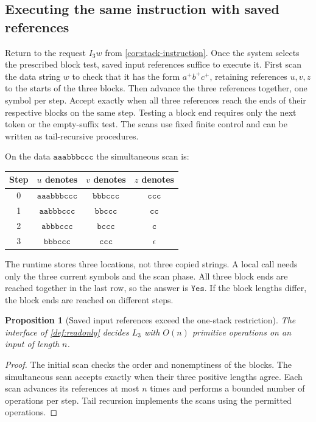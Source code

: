 \documentclass[11pt,twoside]{article}
\newtheorem{proposition}[theorem]{Proposition}
\theoremstyle{definition}
\theoremstyle{remark}
\begin{document}
\subsection{Executing the same instruction with saved references}

Return to the request $I_3w$ from \cref{cor:stack-instruction}. Once the
system selects the prescribed block test, saved input references suffice
to execute it. First scan the data string $w$ to
check that it has the form $a^+b^+c^+$, retaining references $u,v,z$ to the
starts of the three blocks. Then advance the three references together,
one symbol per step. Accept exactly when all three references reach the
ends of their respective blocks on the same step. Testing a block end
requires only the next token or the empty-suffix test. The scans use fixed
finite control and can be written as tail-recursive procedures.

On the data $\mathtt{aaabbbccc}$ the simultaneous scan is:
\begin{center}
\begin{tabular}{c c c c}
\toprule
Step & $u$ denotes & $v$ denotes & $z$ denotes \\
\midrule
0 & $\mathtt{aaabbbccc}$ & $\mathtt{bbbccc}$ & $\mathtt{ccc}$ \\
1 & $\mathtt{aabbbccc}$ & $\mathtt{bbccc}$ & $\mathtt{cc}$ \\
2 & $\mathtt{abbbccc}$ & $\mathtt{bccc}$ & $\mathtt{c}$ \\
3 & $\mathtt{bbbccc}$ & $\mathtt{ccc}$ & $\epsilon$ \\
\bottomrule
\end{tabular}
\end{center}
The runtime stores three locations, not three copied strings. A local call
needs only the three current symbols and the scan phase. All three block
ends are reached together in the last row, so the answer is
$\mathtt{Yes}$. If the block lengths differ, the block ends are reached
on different steps.

\begin{proposition}[Saved input references exceed the one-stack restriction]
\label{prop:three-references}
The interface of \cref{def:readonly} decides $L_3$ with $O(n)$ primitive
operations on an input of length $n$.
\end{proposition}
\begin{proof}
The initial scan checks the order and nonemptiness of the blocks. The
simultaneous scan accepts exactly when their three positive lengths agree.
Each scan advances its references at most $n$ times and performs a bounded
number of operations per step. Tail recursion implements the scans using
the permitted operations.
\end{proof}
\end{document}
